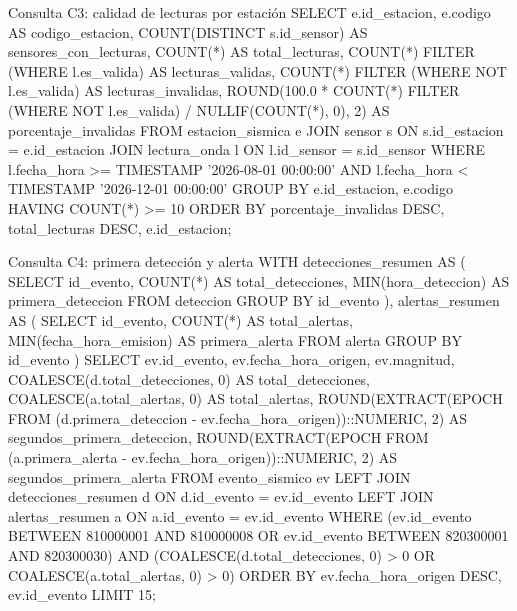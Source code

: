 \documentclass[12pt,a4paper]{article}
\begin{document}
\begin{sqlbloque}{Consulta C3: calidad de lecturas por estación}
SELECT
    e.id_estacion,
    e.codigo AS codigo_estacion,
    COUNT(DISTINCT s.id_sensor) AS sensores_con_lecturas,
    COUNT(*) AS total_lecturas,
    COUNT(*) FILTER (WHERE l.es_valida) AS lecturas_validas,
    COUNT(*) FILTER (WHERE NOT l.es_valida) AS lecturas_invalidas,
    ROUND(100.0 * COUNT(*) FILTER (WHERE NOT l.es_valida)
          / NULLIF(COUNT(*), 0), 2) AS porcentaje_invalidas
FROM estacion_sismica e
JOIN sensor s ON s.id_estacion = e.id_estacion
JOIN lectura_onda l ON l.id_sensor = s.id_sensor
WHERE l.fecha_hora >= TIMESTAMP '2026-08-01 00:00:00'
  AND l.fecha_hora < TIMESTAMP '2026-12-01 00:00:00'
GROUP BY e.id_estacion, e.codigo
HAVING COUNT(*) >= 10
ORDER BY porcentaje_invalidas DESC, total_lecturas DESC, e.id_estacion;
\end{sqlbloque}

\begin{sqlbloque}{Consulta C4: primera detección y alerta}
WITH detecciones_resumen AS (
    SELECT id_evento, COUNT(*) AS total_detecciones,
           MIN(hora_deteccion) AS primera_deteccion
    FROM deteccion
    GROUP BY id_evento
), alertas_resumen AS (
    SELECT id_evento, COUNT(*) AS total_alertas,
           MIN(fecha_hora_emision) AS primera_alerta
    FROM alerta
    GROUP BY id_evento
)
SELECT
    ev.id_evento,
    ev.fecha_hora_origen,
    ev.magnitud,
    COALESCE(d.total_detecciones, 0) AS total_detecciones,
    COALESCE(a.total_alertas, 0) AS total_alertas,
    ROUND(EXTRACT(EPOCH FROM (d.primera_deteccion - ev.fecha_hora_origen))::NUMERIC, 2)
        AS segundos_primera_deteccion,
    ROUND(EXTRACT(EPOCH FROM (a.primera_alerta - ev.fecha_hora_origen))::NUMERIC, 2)
        AS segundos_primera_alerta
FROM evento_sismico ev
LEFT JOIN detecciones_resumen d ON d.id_evento = ev.id_evento
LEFT JOIN alertas_resumen a ON a.id_evento = ev.id_evento
WHERE (ev.id_evento BETWEEN 810000001 AND 810000008
    OR ev.id_evento BETWEEN 820300001 AND 820300030)
  AND (COALESCE(d.total_detecciones, 0) > 0
    OR COALESCE(a.total_alertas, 0) > 0)
ORDER BY ev.fecha_hora_origen DESC, ev.id_evento
LIMIT 15;
\end{sqlbloque}
\end{document}

